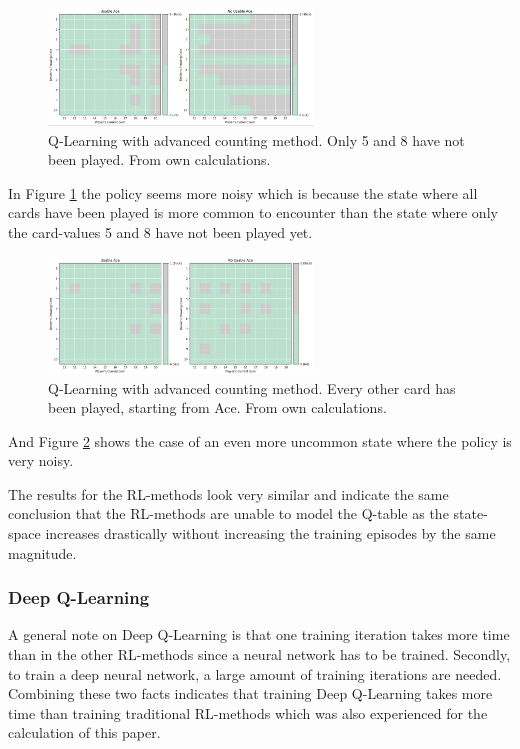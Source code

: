 \documentclass[conference]{IEEEtran}
\begin{document}
\begin{figure}
	\centering
	\includegraphics[width=70mm]{figures/Q-Learning/advanced-counting-10-million/policy-5-8-not-played.png}
	\caption{Q-Learning with advanced counting method. Only 5 and 8 have not been played. From own calculations.}
	\label{fig:q-learning-advanced-5-8-not-played}
\end{figure}

In Figure \ref{fig:q-learning-advanced-5-8-not-played} the policy seems more noisy which is because the state where all cards have been played is more common to encounter than the state where only the card-values 5 and 8 have not been played yet. 

\begin{figure}
	\centering
	\includegraphics[width=70mm]{figures/Q-Learning/advanced-counting-10-million/policy-some-cards-played-1010101010.png}
	\caption{Q-Learning with advanced counting method. Every other card has been played, starting from Ace. From own calculations.}
	\label{fig:q-learning-advanced-every-other}
\end{figure}

And Figure \ref{fig:q-learning-advanced-every-other} shows the case of an even more uncommon state where the policy is very noisy.  

The results for the RL-methods look very similar and indicate the same conclusion that the RL-methods are unable to model the Q-table as the state-space increases drastically without increasing the training episodes by the same magnitude. 

\subsubsection{Deep Q-Learning}
A general note on Deep Q-Learning is that one training iteration takes more time than in the other RL-methods since a neural network has to be trained. 
Secondly, to train a deep neural network, a large amount of training iterations are needed. 
Combining these two facts indicates that training Deep Q-Learning takes more time than training traditional RL-methods which was also experienced for the calculation of this paper.
\end{document}
